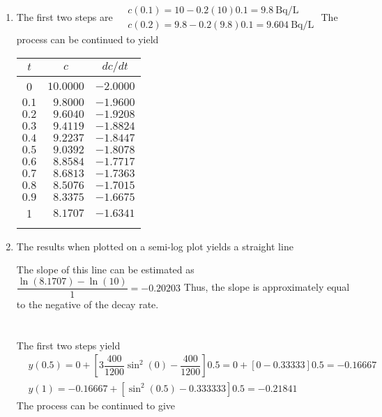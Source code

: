 \documentclass[../main.tex]{subfiles}
\begin{document}
\section{ }
\begin{enumerate}[label=\bfseries(\alph*)]
\item The first two steps are
\bigbreak
$
\begin{aligned}
&c(0.1)=10-0.2(10) 0.1=9.8 \mathrm{~Bq} / \mathrm{L} \\
&c(0.2)=9.8-0.2(9.8) 0.1=9.604 \mathrm{~Bq} / \mathrm{L}
\end{aligned}
$
\bigbreak
The process can be continued to yield
\bigbreak

\begin{tabular}{crr}
\Xhline{1.5pt}
$t$ & \multicolumn{1}{c}{$c$} & \multicolumn{1}{c}{$d c / d t$} \\
\hline
0 & $10.0000$ & $-2.0000$ \\
$0.1$ & $9.8000$ & $-1.9600$ \\
$0.2$ & $9.6040$ & $-1.9208$ \\
$0.3$ & $9.4119$ & $-1.8824$ \\
$0.4$ & $9.2237$ & $-1.8447$ \\
$0.5$ & $9.0392$ & $-1.8078$ \\
$0.6$ & $8.8584$ & $-1.7717$ \\
$0.7$ & $8.6813$ & $-1.7363$ \\
$0.8$ & $8.5076$ & $-1.7015$ \\
$0.9$ & $8.3375$ & $-1.6675$ \\
1 & $8.1707$ & $-1.6341$ \\
\Xhline{1.5pt}
\end{tabular}
\bigbreak

\item The results when plotted on a semi-log plot yields a straight line
\bigbreak

\begin{figure}[H]
		\hspace*{1cm}
		\label{fig:fig_1_3}
	\end{figure}
	\bigbreak

The slope of this line can be estimated as
\bigbreak
$\dfrac{\ln (8.1707)-\ln (10)}{1}=-0.20203$
\bigbreak
Thus, the slope is approximately equal to the negative of the decay rate.
\bigbreak


\section{ }
The first two steps yield
\bigbreak
$
\begin{aligned}
&y(0.5)=0+\left[3 \dfrac{400}{1200} \sin ^{2}(0)-\dfrac{400}{1200}\right] 0.5=0+[0-0.33333] 0.5=-0.16667 \\
&y(1)=-0.16667+\left[\sin ^{2}(0.5)-0.333333\right] 0.5=-0.21841
\end{aligned}
$
\bigbreak
The process can be continued to give
\bigbreak


\end{enumerate}
\end{document}
